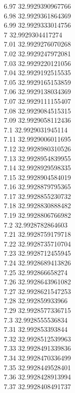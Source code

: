 {6.97	32.9929390967766\\
6.98	32.9929361864369\\
6.99	32.9929333014756\\
7	32.9929304417274\\
7.01	32.9929276070268\\
7.02	32.9929247972081\\
7.03	32.9929220121056\\
7.04	32.9929192515535\\
7.05	32.9929165153859\\
7.06	32.9929138034369\\
7.07	32.9929111155407\\
7.08	32.9929084515315\\
7.09	32.9929058112436\\
7.1	32.9929031945114\\
7.11	32.9929006011695\\
7.12	32.9928980310526\\
7.13	32.9928954839955\\
7.14	32.9928929598335\\
7.15	32.9928904584019\\
7.16	32.9928879795365\\
7.17	32.9928855230732\\
7.18	32.9928830888482\\
7.19	32.9928806766982\\
7.2	32.9928782864603\\
7.21	32.9928759179718\\
7.22	32.9928735710704\\
7.23	32.9928712455945\\
7.24	32.9928689413826\\
7.25	32.992866658274\\
7.26	32.9928643961082\\
7.27	32.9928621547253\\
7.28	32.992859933966\\
7.29	32.9928577336715\\
7.3	32.9928555536834\\
7.31	32.992853393844\\
7.32	32.9928512539963\\
7.33	32.9928491339836\\
7.34	32.9928470336499\\
7.35	32.9928449528401\\
7.36	32.9928428913994\\
7.37	32.9928408491737\\
}
